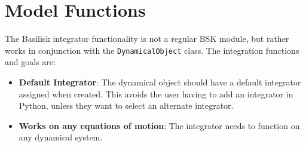 \section{Model Functions}

The Basilisk integrator functionality is not a regular BSK module, but rather works in conjunction with the {\tt DynamicalObject} class.    The integration functions and goals are:


\begin{itemize}
	\item \textbf{Default Integrator}: The dynamical object should have a default integrator assigned when created.  This avoids the user having to add an integrator in Python, unless they want to select an alternate integrator.
	\item \textbf{Works on any equations of motion}: The integrator needs to function on any dynamical system.
\end{itemize}